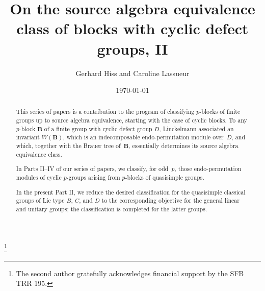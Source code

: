\documentclass[12pt]{amsart}
\newcommand{\bB}{{\mathbf{B}}}
\theoremstyle{theorem}
\theoremstyle{definition}
\theoremstyle{remark}
\begin{document}




\title[On the source algebra equivalence class of blocks with cyclic defect groups, II]
{On the source algebra equivalence class of blocks with cyclic defect groups, II}

\date{\today}

\author{
Gerhard Hiss and  Caroline Lassueur
}
\address{{\sc Gerhard Hiss},  Lehrstuhl f\"ur Algebra und Zahlentheorie, 
RWTH Aachen University, 52056 Aachen, Germany.}
\address{{\sc Caroline Lassueur}, 
RPTU Kaiserslautern--Land\-au, Fachbereich Mathematik,
67653 Kaiserslautern, Germany and Leibniz Universit\"at Hannover,
Institut f\"ur Algebra, Zahlentheorie und Diskrete Mathematik,
Welfengarten 1, 30167 Hannover, Germany.}



\begin{abstract} 
This series of papers is a contribution to the program of classifying
$p$-blocks of finite groups up to source algebra equivalence, starting
with the case of cyclic blocks.
To any $p$-block $\bB$ of a finite group with cyclic defect group $D$, 
Linckelmann associated an invariant $W( \bB )$, which is an indecomposable 
endo-permut\-ati\-on module over~$D$, and which, together with the Brauer tree
of~$\bB$, essentially determines its source algebra equivalence class.

In Parts II--IV of our series of papers, we classify, for odd~$p$, those 
endo-permutation modules of cyclic $p$-groups arising from $p$-blocks of 
quasisimple groups.

In the present Part II, we reduce the desired classification for the quasisimple 
classical groups of Lie type $B$, $C$, and $D$ to the corresponding
objective for the general linear and unitary groups; the classification is 
completed for the latter groups.
\end{abstract}

\thanks{The second author gratefully acknowledges financial support by the SFB TRR 195.}
\end{document}
